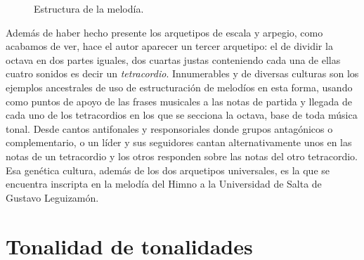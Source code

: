 \begin{figure}[H]
\caption{Estructura de la melodía.}
\label{fig:estructura-melodia}
\end{figure}

Además de haber hecho presente los arquetipos de escala y arpegio, como acabamos de ver, hace el autor aparecer un tercer arquetipo: el de dividir la octava en dos partes iguales, dos cuartas justas conteniendo cada una de ellas cuatro sonidos es decir un \emph{tetracordio}. Innumerables y de diversas culturas son los ejemplos ancestrales de uso de estructuración de melodíos en esta forma, usando como puntos de apoyo de las frases musicales a las notas de partida y llegada de cada uno de los tetracordios en los que se secciona la octava, base de toda música tonal. Desde cantos antifonales y responsoriales donde grupos antagónicos o complementario, o un líder y sus seguidores cantan alternativamente unos en las notas de un tetracordio y los otros responden sobre las notas del otro tetracordio. Esa genética cultura, además de los dos arquetipos universales, es la que se encuentra inscripta en la melodía del Himno a la Universidad de Salta de Gustavo Leguizamón.


\section{Tonalidad de tonalidades}
\label{sec:tonalidad-tonalidades}

